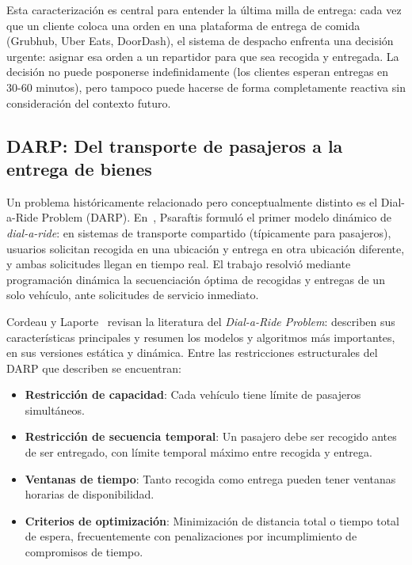 \documentclass[12pt,letterpaper,oneside]{book}
\begin{document}
Esta caracterización es central para entender la última milla de entrega: cada vez que un cliente 
coloca una orden en una plataforma de entrega de comida (Grubhub, Uber Eats, DoorDash), el sistema de despacho enfrenta una decisión 
urgente: asignar esa orden a un repartidor para que sea recogida y entregada. La decisión no puede posponerse 
indefinidamente (los clientes esperan entregas en 30-60 minutos), pero tampoco puede hacerse de forma 
completamente reactiva sin consideración del contexto futuro.

\subsection{DARP: Del transporte de pasajeros a la entrega de bienes}

Un problema históricamente relacionado pero conceptualmente distinto es el Dial-a-Ride Problem (DARP).
En~\cite{Psaraftis1980}, Psaraftis formuló el primer modelo dinámico de
\textit{dial-a-ride}: en sistemas de transporte compartido (típicamente para pasajeros), usuarios solicitan
recogida en una ubicación y entrega en otra ubicación diferente, y ambas solicitudes llegan en tiempo
real. El trabajo resolvió mediante programación dinámica la secuenciación óptima de recogidas y entregas
de un solo vehículo, ante solicitudes de servicio inmediato.

Cordeau y Laporte~\cite{Cordeau2007} revisan la literatura del \textit{Dial-a-Ride Problem}: describen sus
características principales y resumen los modelos y algoritmos más importantes, en sus versiones estática
y dinámica. Entre las restricciones estructurales del DARP que describen se encuentran:

\begin{itemize}
	\item \textbf{Restricción de capacidad}: Cada vehículo tiene límite de pasajeros simultáneos.
	
	\item \textbf{Restricción de secuencia temporal}: Un pasajero debe ser recogido antes de ser entregado, 
	con límite temporal máximo entre recogida y entrega.
	
	\item \textbf{Ventanas de tiempo}: Tanto recogida como entrega pueden tener ventanas horarias de disponibilidad.
	
	\item \textbf{Criterios de optimización}: Minimización de distancia total o tiempo total de espera, 
	frecuentemente con penalizaciones por incumplimiento de compromisos de tiempo.
\end{itemize}
\end{document}
